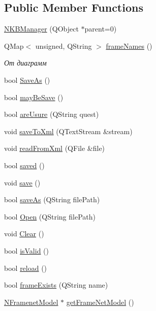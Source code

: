 \subsection*{Public Member Functions}
\begin{DoxyCompactItemize}
\item 
\hyperlink{class_n_k_b_manager_a56e7491862cd961f8bf4549717248c00}{NKBManager} (QObject $\ast$parent=0)
\item 
QMap$<$ unsigned, QString $>$ \hyperlink{class_n_k_b_manager_aa33ef976e72800cf1ae99d72fef80b77}{frameNames} ()
\begin{DoxyCompactList}\small\item\em От диаграмм \end{DoxyCompactList}\item 
bool \hyperlink{class_n_k_b_manager_a7f2a7f5e70fcbc18be6191010b2a1ca8}{SaveAs} ()
\item 
bool \hyperlink{class_n_k_b_manager_ad82d84eebc0058e559793df7c5a729c3}{mayBeSave} ()
\item 
bool \hyperlink{class_n_k_b_manager_a4f2255844ecb473511c9d78d41710c61}{areUsure} (QString quest)
\item 
void \hyperlink{class_n_k_b_manager_ab74a09e1746ecddd43a3c3dd973497d2}{saveToXml} (QTextStream \&stream)
\item 
void \hyperlink{class_n_k_b_manager_ad297868abea83e581cf39a2fe05f1d74}{readFromXml} (QFile \&file)
\item 
bool \hyperlink{class_n_k_b_manager_a4f4c464a44aae985ecf65a58b6a9d140}{saved} ()
\item 
void \hyperlink{class_n_k_b_manager_a2cf07bab13b2faf35961f361716b9f1f}{save} ()
\item 
bool \hyperlink{class_n_k_b_manager_a17e148e018d71da742e4a67925eca5dd}{saveAs} (QString filePath)
\item 
bool \hyperlink{class_n_k_b_manager_a35b162d0a94735b39f0259b1600395e3}{Open} (QString filePath)
\item 
void \hyperlink{class_n_k_b_manager_ada298fb036a65df3e0c1c6ae9083b84b}{Clear} ()
\item 
bool \hyperlink{class_n_k_b_manager_a5a714660c9cb04a6c78f758fee819cb1}{isValid} ()
\item 
bool \hyperlink{class_n_k_b_manager_a15f1dc2a346562d2f02092fe3c75497c}{reload} ()
\item 
bool \hyperlink{class_n_k_b_manager_ac18fa994065af86a441e14fdb44289cd}{frameExists} (QString name)
\item 
\hyperlink{class_n_framenet_model}{NFramenetModel} $\ast$ \hyperlink{class_n_k_b_manager_a6f604142f6ba864912f6fe65d474f5d4}{getFrameNetModel} ()

\end{DoxyCompactItemize}

